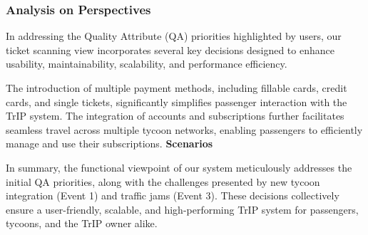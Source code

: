 \subsubsection{Analysis on Perspectives}
In addressing the Quality Attribute (QA) priorities highlighted by users, our ticket scanning view incorporates several key decisions designed to enhance usability, maintainability, scalability, and performance efficiency.

The introduction of multiple payment methods, including fillable cards, credit cards, and single tickets, significantly simplifies passenger interaction with the TrIP system. The integration of accounts and subscriptions further facilitates seamless travel across multiple tycoon networks, enabling passengers to efficiently manage and use their subscriptions.
\newline
\newline
\noindent \textbf{Scenarios}
\scenarioThreeFunctional

In summary, the functional viewpoint of our system meticulously addresses the initial QA priorities, along with the challenges presented by new tycoon integration (Event 1) and traffic jams (Event 3). These decisions collectively ensure a user-friendly, scalable, and high-performing TrIP system for passengers, tycoons, and the TrIP owner alike.